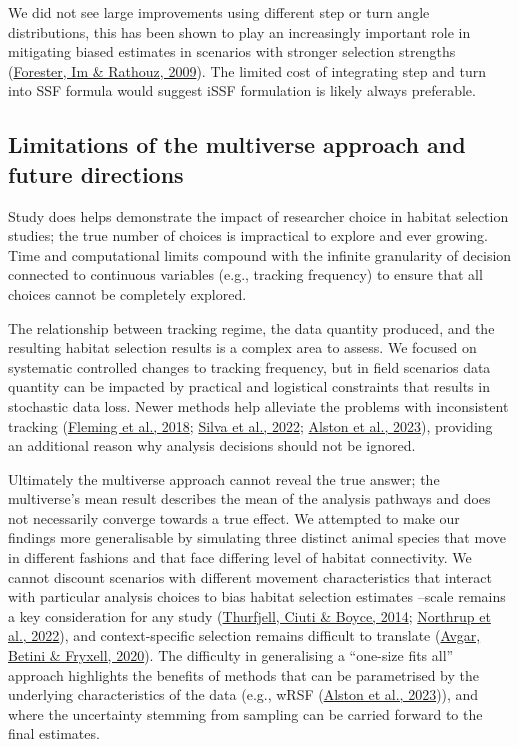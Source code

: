 \documentclass[10pt,a4paper]{article}
\begin{document}
We did not see large improvements using different step or turn angle distributions, this has been shown to play an increasingly important role in mitigating biased estimates in scenarios with stronger selection strengths (\protect\hyperlink{ref-forester_accounting_2009}{Forester, Im \& Rathouz, 2009}).
The limited cost of integrating step and turn into SSF formula would suggest iSSF formulation is likely always preferable.

\hypertarget{limitations-of-the-multiverse-approach-and-future-directions}{%
\subsection{Limitations of the multiverse approach and future directions}\label{limitations-of-the-multiverse-approach-and-future-directions}}

Study does helps demonstrate the impact of researcher choice in habitat selection studies; the true number of choices is impractical to explore and ever growing.
Time and computational limits compound with the infinite granularity of decision connected to continuous variables (e.g., tracking frequency) to ensure that all choices cannot be completely explored.

The relationship between tracking regime, the data quantity produced, and the resulting habitat selection results is a complex area to assess.
We focused on systematic controlled changes to tracking frequency, but in field scenarios data quantity can be impacted by practical and logistical constraints that results in stochastic data loss.
Newer methods help alleviate the problems with inconsistent tracking (\protect\hyperlink{ref-fleming_correcting_2018}{Fleming et al., 2018}; \protect\hyperlink{ref-silva_autocorrelationinformed_2022}{Silva et al., 2022}; \protect\hyperlink{ref-alston_mitigating_2023}{Alston et al., 2023}), providing an additional reason why analysis decisions should not be ignored.

Ultimately the multiverse approach cannot reveal the true answer; the multiverse's mean result describes the mean of the analysis pathways and does not necessarily converge towards a true effect.
We attempted to make our findings more generalisable by simulating three distinct animal species that move in different fashions and that face differing level of habitat connectivity.
We cannot discount scenarios with different movement characteristics that interact with particular analysis choices to bias habitat selection estimates --scale remains a key consideration for any study (\protect\hyperlink{ref-thurfjell_applications_2014}{Thurfjell, Ciuti \& Boyce, 2014}; \protect\hyperlink{ref-northrup_conceptual_2022}{Northrup et al., 2022}), and context-specific selection remains difficult to translate (\protect\hyperlink{ref-avgar_habitat_2020}{Avgar, Betini \& Fryxell, 2020}).
The difficulty in generalising a ``one-size fits all'' approach highlights the benefits of methods that can be parametrised by the underlying characteristics of the data (e.g., wRSF (\protect\hyperlink{ref-alston_mitigating_2023}{Alston et al., 2023})), and where the uncertainty stemming from sampling can be carried forward to the final estimates.
\end{document}
